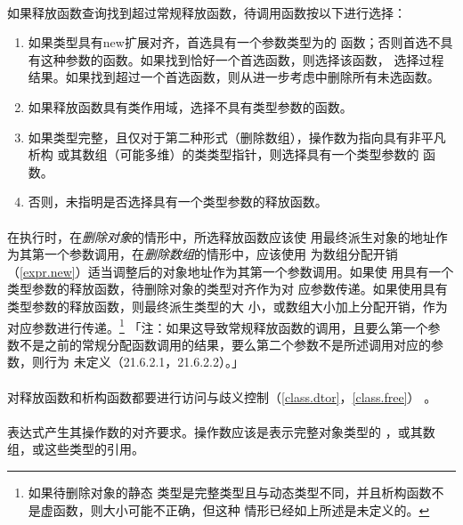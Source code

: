 \paragraph{}
如果释放函数查询找到超过常规释放函数，待调用函数按以下进行选择：
\begin{enumerate}
  \item{如果类型具有new扩展对齐，首选具有一个参数类型为的
    函数；否则首选不具有这种参数的函数。如果找到恰好一个首选函数，则选择该函数，
    选择过程结果。如果找到超过一个首选函数，则从进一步考虑中删除所有未选函数。}
  \item{如果释放函数具有类作用域，选择不具有类型参数的函数。}
  \item{如果类型完整，且仅对于第二种形式（删除数组），操作数为指向具有非平凡析构
    或其数组（可能多维）的类类型指针，则选择具有一个类型参数的
    函数。}
  \item{否则，未指明是否选择具有一个类型参数的释放函数。}
\end{enumerate}

\paragraph{}
在执行时，在\textit{删除对象}的情形中，所选释放函数应该使
用最终派生对象的地址作为其第一个参数调用，在\textit{删除数组}的情形中，应该使用
为数组分配开销（\ref{expr.new}）适当调整后的对象地址作为其第一个参数调用。如果使
用具有一个类型参数的释放函数，待删除对象的类型对齐作为对
应参数传递。如果使用具有类型参数的释放函数，则最终派生类型的大
小，或数组大小加上分配开销，作为对应参数进行传递。\footnote{如果待删除对象的静态
类型是完整类型且与动态类型不同，并且析构函数不是虚函数，则大小可能不正确，但这种
情形已经如上所述是未定义的。} 「注：如果这导致常规释放函数的调用，且要么第一个参
数不是之前的常规分配函数调用的结果，要么第二个参数不是所述调用对应的参数，则行为
未定义（21.6.2.1，21.6.2.2）。」

\paragraph{}
对释放函数和析构函数都要进行访问与歧义控制（\ref{class.dtor}，\ref{class.free}）
。

\paragraph{}
表达式产生其操作数的对齐要求。操作数应该是表示完整对象类型的
，或其数组，或这些类型的引用。

